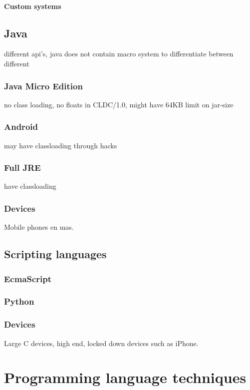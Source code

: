 \paragraph{Custom systems}

\subsection{Java}
different api's, java does not contain macro system to differentiate between different 
\subsubsection{Java Micro Edition}
no class loading, 
no floats in CLDC/1.0,
might have 64KB limit on jar-size
\subsubsection{Android}
may have classloading through hacks
\subsubsection{Full JRE}
have classloading
\subsubsection{Devices}
Mobile phones en mas.


\subsection{Scripting languages}
\subsubsection{EcmaScript}
\subsubsection{Python}
\subsubsection{Devices}
Large C devices, high end, locked down devices such as iPhone.

\section{Programming language techniques}
